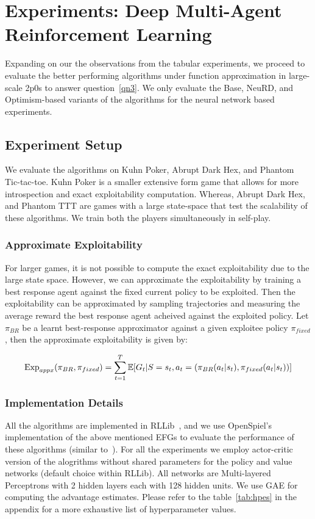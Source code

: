 \chapter{Experiments: Deep Multi-Agent Reinforcement Learning}
Expanding on our the observations from the tabular experiments, we proceed to evaluate the better
performing algorithms under function approximation in large-scale 2p0s to answer
question~\ref{qn3}.
We only evaluate the Base, NeuRD, and Optimism-based variants of the algorithms for the neural
network based experiments.

\section{Experiment Setup}
We evaluate the algorithms on Kuhn Poker, Abrupt Dark Hex, and Phantom Tic-tac-toe.
Kuhn Poker is a smaller extensive form game that allows for more introspection and exact
exploitability computation.
Whereas, Abrupt Dark Hex, and Phantom TTT are games with a large state-space that test the
scalability of these algorithms.
We train both the players simultaneously in self-play.

\subsection{Approximate Exploitability}
For larger games, it is not possible to compute the exact exploitability due to the large state
space.
However, we can approximate the exploitability by training a best response agent against the fixed
current policy to be exploited.
Then the exploitability can be approximated by sampling trajectories and measuring the average
reward the best response agent acheived against the exploited policy.
Let $\pi_{BR}$ be a learnt best-response approximator against a given exploitee policy
$\pi_{fixed}$, then the approximate exploitability is given by:

$$\text{Exp}_{appx} (\pi_{BR}, \pi_{fixed}) = \sum_{t=1}^T \mathbb{E}[G_t | S=s_t, a_t=(\pi_{BR}(a_t|s_t),
		\pi_{fixed}(a_t|s_t))]$$

\subsection{Implementation Details} All the algorithms
are implemented in RLLib~\cite{liangRLlib2018}, and we use OpenSpiel's implementation of the above
mentioned EFGs to evaluate the performance of these algorithms (similar
to~\cite{sokotaUnified2023}).
For all the experiments we employ actor-critic version of the alogrithms without shared parameters
for the policy and value networks (default choice within RLLib).
All networks are Multi-layered Perceptrons with 2 hidden layers each with 128 hidden units.
We use GAE for computing the advantage estimates.
Please refer to the table~\ref{tab:hpes} in the appendix for a more exhaustive list of
hyperparameter values.

